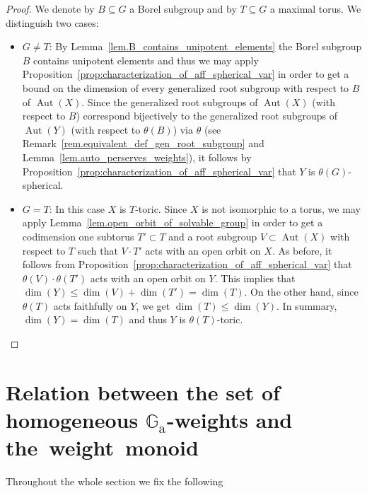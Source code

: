 \documentclass[JEP,XML,SOM,Unicode]{cedram}
\newcommand{\ra}{\mathrm{a}}
\theoremstyle{plain}
\theoremstyle{definition}
\DeclareMathOperator{\Aut}{Aut}
\newcommand{\GG}{\mathbb{G}}
\begin{document}
\begin{proof}
We denote by $B \subseteq G$
a Borel subgroup and by $T \subseteq G$ a maximal torus. We distinguish two cases:

\begin{itemize}
\item
$G \neq T$: By Lemma~\ref{lem.B_contains_unipotent_elements} the Borel subgroup $B$
contains unipotent elements and thus we may apply
Proposition~\ref{prop:characterization_of_aff_spherical_var} in order to get
a bound on the dimension of every generalized root subgroup with respect to $B$ of $\Aut(X)$.
Since the generalized root subgroups of $\Aut(X)$ (with respect to $B$)
correspond bijectively to the generalized root subgroups of $\Aut(Y)$
(with respect to $\theta(B)$) via $\theta$ (see Remark~\ref{rem.equivalent_def_gen_root_subgroup}
and Lemma~\ref{lem.auto_perserves_weights}), it follows by
Proposition~\ref{prop:characterization_of_aff_spherical_var} that
$Y$ is $\theta(G)$-spherical.

\item
$G = T$: In this case $X$ is $T$-toric. Since $X$ is not isomorphic to a torus, we may apply
Lemma~\ref{lem.open_orbit_of_solvable_group} in order to get a codimension one subtorus
$T' \subset T$ and a root subgroup $V \subset \Aut(X)$ with respect
to $T$ such that $V \cdot T'$ acts with an open orbit on $X$.
As before, it follows from Proposition~\ref{prop:characterization_of_aff_spherical_var} that
$\theta(V) \cdot \theta(T')$ acts with an open orbit on $Y$. This implies that
$\dim(Y) \leq \dim(V) + \dim(T') = \dim(T)$. On the other hand, since
$\theta(T)$ acts faithfully on $Y$, we get $\dim(T) \leq \dim(Y)$. In summary,
$\dim(Y) = \dim(T)$ and thus $Y$ is $\theta(T)$-toric.\qedhere
\end{itemize}
\end{proof}

\section{Relation between the set of homogeneous \texorpdfstring{$\GG_\ra$}{Ga}-weights and the~weight~monoid}
\label{sec.relation_homogen_Ga-weights_weight_monoid}

Throughout the whole section we fix the following
\end{document}
